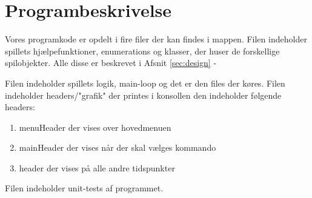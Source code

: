 \documentclass[a4paper]{article}
\begin{document}
  \section{Programbeskrivelse} \label{sec:programDescription}
    Vores programkode er opdelt i fire filer der kan findes i  mappen.
    Filen  indeholder spillets hjælpefunktioner, enumerations og klasser,
    der huser de forskellige spilobjekter. Alle disse er beskrevet i Afsnit \ref{sec:design} - 

    Filen  indeholder spillets logik, main-loop og det er den files der køres.
    Filen  indeholder headers/"grafik" der printes i konsollen den indeholder følgende headers:
    \begin{enumerate}
      \item menuHeader der vises over hovedmenuen
      \item mainHeader der vises når der skal vælges kommando
      \item header der vises på alle andre tidspunkter
    \end{enumerate}
    Filen  indeholder unit-tests af programmet.
\end{document}
